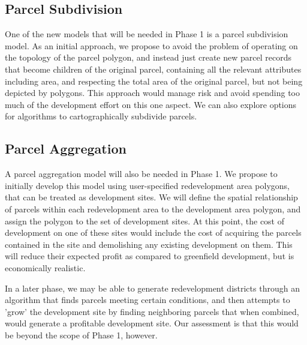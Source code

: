\subsection{Parcel Subdivision}
One of the new models that will be needed in Phase 1 is a parcel
subdivision model.  As an initial approach, we propose to avoid the
problem of operating on the topology of the parcel polygon, and
instead just create new parcel records that become children of the
original parcel, containing all the relevant attributes including
area, and respecting the total area of the original parcel, but not
being depicted by polygons.  This approach would manage risk and
avoid spending too much of the development effort on this one
aspect.  We can also explore options for algorithms to
cartographically subdivide parcels.

\subsection{Parcel Aggregation}
A parcel aggregation model will also be needed in Phase 1.  We
propose to initially develop this model using user-specified
redevelopment area polygons, that can be treated as development
sites.  We will define the spatial relationship of parcels within
each redevelopment area to the development area polygon, and assign
the polygon to the set of development sites.  At this point, the
cost of development on one of these sites would include the cost of
acquiring the parcels contained in the site and demolishing any
existing development on them.  This will reduce their expected
profit as compared to greenfield development, but is economically
realistic.

In a later phase, we may be able to generate redevelopment districts
through an algorithm that finds parcels meeting certain conditions,
and then attempts to 'grow' the development site by finding
neighboring parcels that when combined, would generate a profitable
development site.  Our assessment is that this would be beyond the
scope of Phase 1, however.
